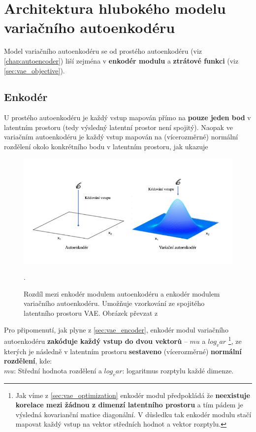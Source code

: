 \section{Architektura hlubokého modelu variačního autoenkodéru}
Model variačního autoenkodéru se od prostého autoenkodéru (viz \autoref{chap:autoencoder}) liší zejména v \textbf{enkodér modulu} a \textbf{ztrátové funkci} (viz \autoref{sec:vae_objective}).
\subsection{Enkodér}
U prostého autoenkodéru je každý vstup mapován přímo na \textbf{pouze jeden bod} v latentním prostoru (tedy výsledný latentní prostor není spojitý).
Naopak ve variačním autoenkodéru je každý vstup mapován na (vícerozměrné) normální rozdělení okolo konkrétního bodu v latentním prostoru, jak ukazuje

\begin{figure}[H]
    \centering
    \includegraphics[width=\textwidth]{figures/vae_encoder_module.png}
    \caption{Rozdíl mezi enkodér modulem autoenkodéru a enkodér modulem variačního autoenkodéru. Umožňuje vzorkování ze spojitého latentního prostoru VAE. Obrázek převzat z \textcite{Foster2023}}.
    \label{fig:vae_encoder_difference}
\end{figure}

Pro připomenutí, jak plyne z \autoref{sec:vae_encoder}, enkodér modul variačního autoenkodéru \textbf{zakóduje každý vstup do dvou vektorů} – $mu$ a $log_var$
\footnote{Jak víme z \autoref{sec:vae_optimization} enkodér modul předpokládá že \textbf{neexistuje korelace mezi žádnou z dimenzí latentního prostoru} a tím pádem je výsledná kovarianční matice diagonální. V důsledku tak enkodér modulu stačí mapovat každý vstup na vektor středních hodnot a vektor rozptylu.},
ze kterých je následně v latentním prostoru \textbf{sestaveno} (vícerozměrné) \textbf{normální rozdělení}, kde:\\
$mu$: Střední hodnota rozdělení a $log_var$: logaritmus rozptylu každé dimenze.\\

